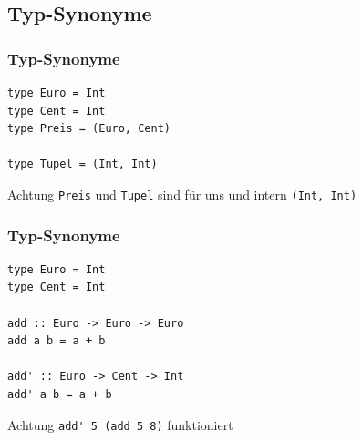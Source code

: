 \documentclass[fleqn,11pt,aspectratio=43]{beamer}
\begin{document}
\subsection{Typ-Synonyme}

\begin{frame}[fragile]
\frametitle{Typ-Synonyme} 
\begin{lstlisting}
type Euro = Int
type Cent = Int
type Preis = (Euro, Cent)

type Tupel = (Int, Int)
\end{lstlisting}
\begin{alertblock}{Achtung}
\lstinline|Preis| und \lstinline|Tupel| sind für uns und intern \lstinline|(Int, Int)|
\end{alertblock}
\end{frame}

\begin{frame}[fragile]
\frametitle{Typ-Synonyme} 
\begin{lstlisting}
type Euro = Int
type Cent = Int

add :: Euro -> Euro -> Euro
add a b = a + b

add' :: Euro -> Cent -> Int
add' a b = a + b
\end{lstlisting}
\begin{alertblock}{Achtung}
\lstinline|add' 5 (add 5 8)| funktioniert
\end{alertblock}
\end{frame}
\end{document}
